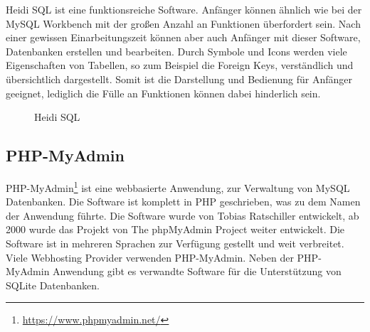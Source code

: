 Heidi SQL ist eine funktionsreiche Software. Anfänger können ähnlich wie bei der MySQL Workbench mit der großen Anzahl an Funktionen überfordert sein. Nach einer gewissen Einarbeitungszeit können aber auch Anfänger mit dieser Software, Datenbanken erstellen und bearbeiten. Durch Symbole und Icons werden viele Eigenschaften von Tabellen, so zum Beispiel die Foreign Keys, verständlich und übersichtlich dargestellt. Somit ist die Darstellung und Bedienung für Anfänger geeignet, lediglich die Fülle an Funktionen können dabei hinderlich sein. 
\begin{figure}[ht]
        \centering
        \caption{Heidi SQL}
        \label{pic:heidi_sql}
\end{figure}

\subsection{PHP-MyAdmin}
\label{sec02:php_myadmin}
PHP-MyAdmin\footnote{\url{https://www.phpmyadmin.net/}} ist eine webbasierte Anwendung, zur Verwaltung von MySQL Datenbanken. Die Software ist komplett in PHP geschrieben, was zu dem Namen der Anwendung führte. Die Software wurde von Tobias Ratschiller entwickelt, ab 2000 wurde das Projekt von The phpMyAdmin Project weiter entwickelt.
Die Software ist in mehreren Sprachen zur Verfügung gestellt und weit verbreitet. Viele Webhosting Provider verwenden PHP-MyAdmin. Neben der PHP-MyAdmin Anwendung gibt es verwandte Software für die Unterstützung von SQLite Datenbanken.

